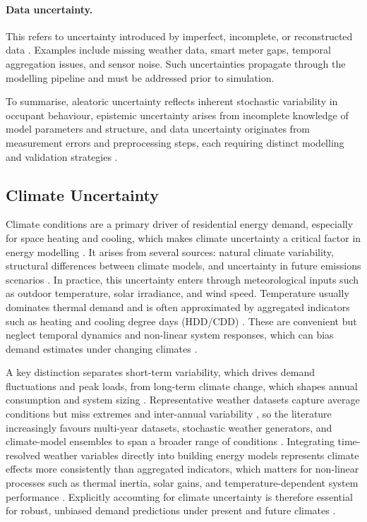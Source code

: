 \paragraph{Data uncertainty.}
This refers to uncertainty introduced by imperfect, incomplete, or reconstructed data \cite{ASHRAE14}. Examples include missing weather data, smart meter gaps, temporal aggregation issues, and sensor noise. Such uncertainties propagate through the modelling pipeline and must be addressed prior to simulation.

To summarise, aleatoric uncertainty reflects inherent stochastic variability in occupant behaviour, epistemic uncertainty arises from incomplete knowledge of model parameters and structure, and data uncertainty originates from measurement errors and preprocessing steps, each requiring distinct modelling and validation strategies \cite{hongTenQuestionsBuilding2025,Smith2014}.


\subsection{Climate Uncertainty}
Climate conditions are a primary driver of residential energy demand, especially for space heating and cooling, which makes climate uncertainty a critical factor in energy modelling \cite{IPCC2021,DeWilde2014}. It arises from several sources: natural climate variability, structural differences between climate models, and uncertainty in future emissions scenarios \cite{IPCC2010}. In practice, this uncertainty enters through meteorological inputs such as outdoor temperature, solar irradiance, and wind speed. Temperature usually dominates thermal demand and is often approximated by aggregated indicators such as heating and cooling degree days (HDD/CDD) \cite{Clarke2001}. These are convenient but neglect temporal dynamics and non-linear system responses, which can bias demand estimates under changing climates \cite{DeWilde2014}.

A key distinction separates short-term variability, which drives demand fluctuations and peak loads, from long-term climate change, which shapes annual consumption and system sizing \cite{IPCC2021}. Representative weather datasets capture average conditions but miss extremes and inter-annual variability \cite{Wilcox2008}, so the literature increasingly favours multi-year datasets, stochastic weather generators, and climate-model ensembles to span a broader range of conditions \cite{Semenov2010,Saltelli2008}.
Integrating time-resolved weather variables directly into building energy models represents climate effects more consistently than aggregated indicators, which matters for non-linear processes such as thermal inertia, solar gains, and temperature-dependent system performance \cite{Clarke2001}. Explicitly accounting for climate uncertainty is therefore essential for robust, unbiased demand predictions under present and future climates \cite{DeWilde2014,IPCC2021}.


